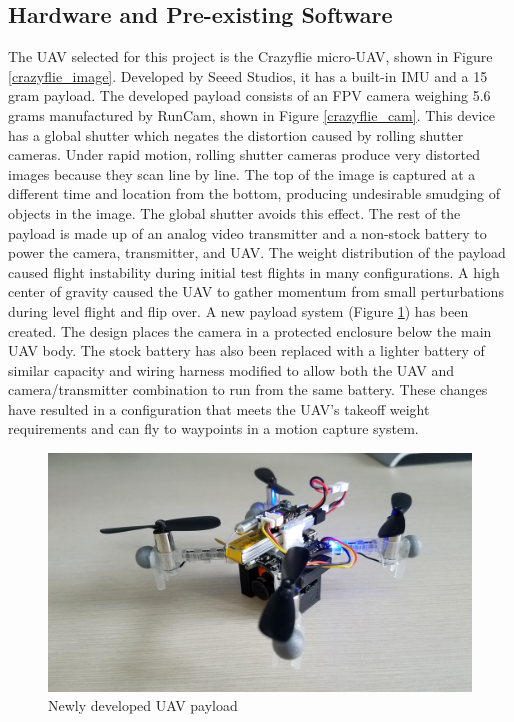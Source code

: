 \documentclass[12pt]{article}
\begin{document}
\subsection{Hardware and Pre-existing Software}
The UAV selected for this project is the Crazyflie micro-UAV, shown in Figure \ref{crazyflie_image}. Developed by Seeed Studios, it has a built-in IMU and a 15 gram payload. The developed payload consists of an FPV camera weighing 5.6 grams manufactured by RunCam, shown in Figure \ref{crazyflie_cam}. This device has a global shutter which negates the distortion caused by rolling shutter cameras. Under rapid motion, rolling shutter cameras produce very distorted images because they scan line by line. The top of the image is captured at a different time and location from the bottom, producing undesirable smudging of objects in the image. The global shutter avoids this effect. The rest of the payload is made up of an analog video transmitter and a non-stock battery to power the camera, transmitter, and UAV. The weight distribution of the payload caused flight instability during initial test flights in many configurations. A high center of gravity caused the UAV to gather momentum from small perturbations during level flight and flip over. A new payload system (Figure \ref{payload}) has been created. The design places the camera in a protected enclosure below the main UAV body. The stock battery has also been replaced with a lighter battery of similar capacity and wiring harness modified to allow both the UAV and camera/transmitter combination to run from the same battery. These changes have resulted in a configuration that meets the UAV's takeoff weight requirements and can fly to waypoints in a motion capture system.

\begin{figure}
    \centering
    \includegraphics[scale=0.075]{payload1}
    \vspace{10pt}
    \caption[Newly developed UAV payload]{Newly developed UAV payload}
    \label{payload}
\end{figure}
\end{document}
